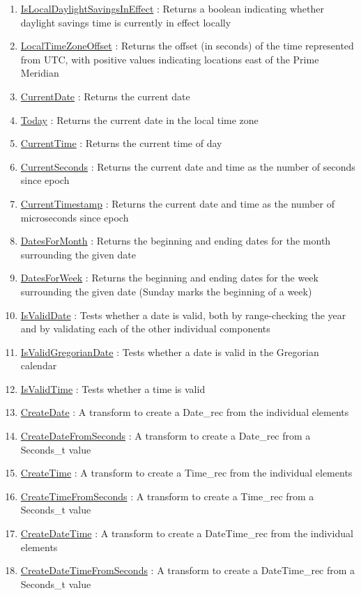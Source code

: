 \begin{enumerate}
\item \hyperlink{ecldoc:date.islocaldaylightsavingsineffect}{IsLocalDaylightSavingsInEffect}
: Returns a boolean indicating whether daylight savings time is currently in effect locally
\item \hyperlink{ecldoc:date.localtimezoneoffset}{LocalTimeZoneOffset}
: Returns the offset (in seconds) of the time represented from UTC, with positive values indicating locations east of the Prime Meridian
\item \hyperlink{ecldoc:date.currentdate}{CurrentDate}
: Returns the current date
\item \hyperlink{ecldoc:date.today}{Today}
: Returns the current date in the local time zone
\item \hyperlink{ecldoc:date.currenttime}{CurrentTime}
: Returns the current time of day
\item \hyperlink{ecldoc:date.currentseconds}{CurrentSeconds}
: Returns the current date and time as the number of seconds since epoch
\item \hyperlink{ecldoc:date.currenttimestamp}{CurrentTimestamp}
: Returns the current date and time as the number of microseconds since epoch
\item \hyperlink{ecldoc:date.datesformonth}{DatesForMonth}
: Returns the beginning and ending dates for the month surrounding the given date
\item \hyperlink{ecldoc:date.datesforweek}{DatesForWeek}
: Returns the beginning and ending dates for the week surrounding the given date (Sunday marks the beginning of a week)
\item \hyperlink{ecldoc:date.isvaliddate}{IsValidDate}
: Tests whether a date is valid, both by range-checking the year and by validating each of the other individual components
\item \hyperlink{ecldoc:date.isvalidgregoriandate}{IsValidGregorianDate}
: Tests whether a date is valid in the Gregorian calendar
\item \hyperlink{ecldoc:date.isvalidtime}{IsValidTime}
: Tests whether a time is valid
\item \hyperlink{ecldoc:date.createdate}{CreateDate}
: A transform to create a Date\_rec from the individual elements
\item \hyperlink{ecldoc:date.createdatefromseconds}{CreateDateFromSeconds}
: A transform to create a Date\_rec from a Seconds\_t value
\item \hyperlink{ecldoc:date.createtime}{CreateTime}
: A transform to create a Time\_rec from the individual elements
\item \hyperlink{ecldoc:date.createtimefromseconds}{CreateTimeFromSeconds}
: A transform to create a Time\_rec from a Seconds\_t value
\item \hyperlink{ecldoc:date.createdatetime}{CreateDateTime}
: A transform to create a DateTime\_rec from the individual elements
\item \hyperlink{ecldoc:date.createdatetimefromseconds}{CreateDateTimeFromSeconds}
: A transform to create a DateTime\_rec from a Seconds\_t value
\end{enumerate}

